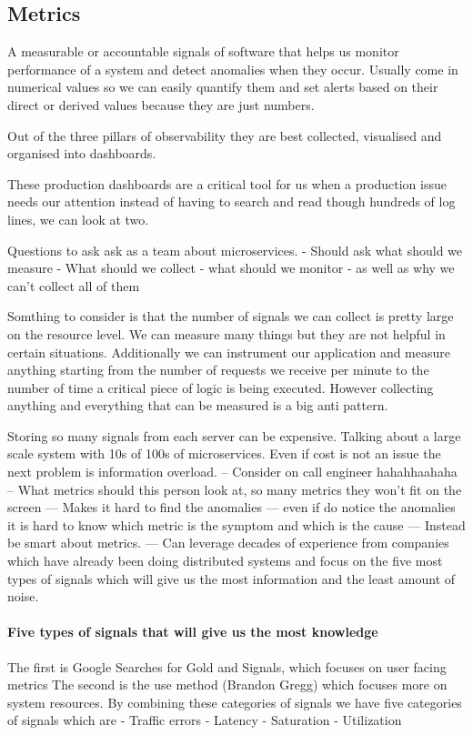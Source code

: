 \documentclass[a4paper, 11pt]{book}
\begin{document}
    \subsection{Metrics}
    A measurable or accountable signals of software that helps us monitor performance of a system and detect anomalies when they occur.
    Usually come in numerical values so we can easily quantify them and set alerts based on their direct or derived values because they are just numbers.

    Out of the three pillars of observability they are best collected, visualised and organised into dashboards.

    These production dashboards are a critical tool for us when a production issue needs our attention instead of having to search and read though hundreds of log lines, we can look at two.

    Questions to ask ask as a team about microservices.
    - Should ask what should we measure
    - What should we collect
    - what should we monitor
    - as well as why we can't collect all of them

    Somthing to consider is that the number of signals we can collect is pretty large on the resource level.
    We can measure many things but they are not helpful in certain situations.
    Additionally we can instrument our application and measure anything starting from the number of requests we receive per minute to the number of time a critical piece of logic is being executed.
    However collecting anything and everything that can be measured is a big anti pattern.

    Storing so many signals from each server can be expensive.
    Talking about a large scale system with 10s of 100s of microservices.
    Even if cost is not an issue the next problem is information overload.
    -- Consider on call engineer hahahhaahaha
    -- What metrics should this person look at, so many metrics they won't fit on the screen
    --- Makes it hard to find the anomalies
    --- even if do notice the anomalies it is hard to know which metric is the symptom and which is the cause
    --- Instead be smart about metrics.
    --- Can leverage decades of experience from companies which have already been doing distributed systems and focus on the five most types of signals which will give us the most information and the least amount of noise.

    \paragraph{Five types of signals that will give us the most knowledge}
    The first is Google Searches for Gold and Signals, which focuses on user facing metrics
    The second is the use method (Brandon Gregg) which focuses more on system resources.
    By combining these categories of signals we have five categories of signals which are
    - Traffic errors
    - Latency
    - Saturation
    - Utilization
\end{document}
